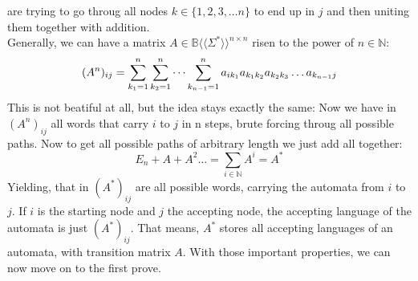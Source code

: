 \documentclass[12pt,letterpaper]{article}
\newcommand{\fps}[1] {
\mathbb{#1}\langle \langle \Sigma^* \rangle \rangle
}
\begin{document}
are trying to go throug all nodes $k \in \{1, 2, 3, \dots n\}$
to end up in $j$ and then uniting them together with addition.\\
Generally, we can have a matrix $A \in \fps{B}^{n \times n}$
risen to the power of $n \in \mathbb{N}$:
\[
  (A^n)_{ij} = \sum_{k_1=1}^{n}
    \sum_{k_2=1}^{n}\dots \sum_{k_{n-1}=1}^n 
    a_{ik_1}a_{k_1k_2}a_{k_2k_3}\dots a_{k_{n-1}j} \\
\]
This is not beatiful at all, but the idea stays exactly the same: Now
we have in $(A^n)_{ij}$ all words that carry $i$ to $j$ in n steps,
brute forcing throug all possible paths. Now to get all possible paths
of arbitrary length we just add all together:
\[
  E_n + A + A^2 \dots = \sum_{i \in \mathbb{N}} A^i = A^*
\]
Yielding, that in $(A^*)_{ij}$ are all possible words, carrying
the automata from $i$ to $j$. If $i$ is the starting node and $j$
the accepting node, the accepting language of the automata is just
$(A^*)_{ij}$. That means, $A^*$ stores all accepting languages of 
an automata, with transition matrix $A$.
With those important properties, we can now move on to the first prove.
\end{document}

